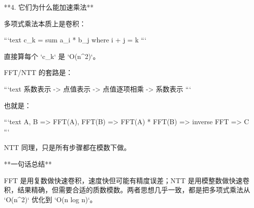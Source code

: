 **4. 它们为什么能加速乘法**

多项式乘法本质上是卷积：

```text
c_k = sum a_i * b_j    where i + j = k
```

直接算每个 `c_k` 是 `O(n^2)`。

FFT/NTT 的套路是：

```text
系数表示 -> 点值表示 -> 点值逐项相乘 -> 系数表示
```

也就是：

```text
A, B
=> FFT(A), FFT(B)
=> FFT(A) * FFT(B)
=> inverse FFT
=> C
```

NTT 同理，只是所有步骤都在模数下做。

**一句话总结**

FFT 是用复数做快速卷积，速度快但可能有精度误差；NTT 是用模整数做快速卷积，结果精确，但需要合适的质数模数。两者思想几乎一致，都是把多项式乘法从 `O(n^2)` 优化到 `O(n log n)`。